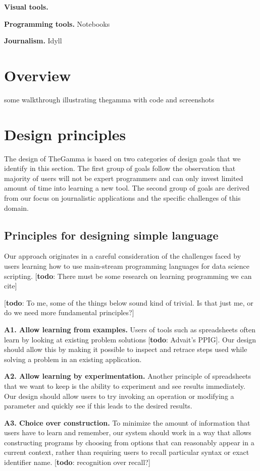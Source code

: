 \documentclass{sigchi}
\newcommand{\todo}[1]{\textcolor{todoColor}{[\textbf{todo}: #1]}}
\begin{document}
\textbf{Visual tools.}

\textbf{Programming tools.}
Notebooks

\textbf{Journalism.}
Idyll

\section{Overview}

some walkthrough illustrating thegamma with code and screenshots

\newpage

\section{Design principles}
The design of TheGamma is based on two categories of design goals that we identify in this
section. The first group of goals follow the observation that majority of users will not be
expert programmers and can only invest limited amount of time into learning a new tool. The
second group of goals are derived from our focus on journalistic applications and the specific
challenges of this domain.

\subsection{Principles for designing simple language}
Our approach originates in a careful consideration of the challenges faced by users learning
how to use main-stream programming languages for data science scripting. \todo{There must be
some research on learning programming we can cite}

\todo{To me, some of the things below sound kind of trivial. Is that just me, or do we
need more fundamental principles?}

\textbf{A1. Allow learning from examples.} Users of tools such as spreadsheets often learn by
looking at existing problem solutions \todo{Advait's PPIG}. Our design should allow this by
making it possible to inspect and retrace steps used while solving a problem in an existing
application.

\textbf{A2. Allow learning by experimentation.} Another principle of spreadsheets that we want
to keep is the ability to experiment and see results immediately. Our design should allow users
to try invoking an operation or modifying a parameter and quickly see if this leads to the
desired results.

\textbf{A3. Choice over construction.} To minimize the amount of information that users have to
learn and remember, our system should work in a way that allows constructing programs by
choosing from options that can reasonably appear in a current context, rather than requiring
users to recall particular syntax or exact identifier name.
\todo{recognition over recall?}
\end{document}
